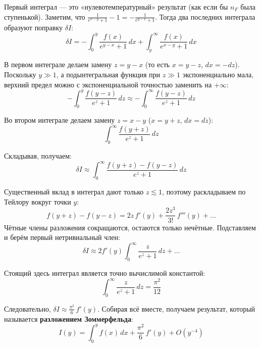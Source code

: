 \documentclass[../general/general]{subfiles}
\begin{document}
Первый интеграл --- это «нулевотемпературный» результат (как если бы $n_F$ была ступенькой). Заметим, что $\frac{1}{e^{x-y}+1} - 1 = -\frac{1}{e^{y-x}+1}$. Тогда два последних интеграла образуют поправку $\delta I$:
\begin{equation}
    \delta I = -\int_0^y \frac{f(x)}{e^{y-x}+1}\, dx + \int_y^\infty \frac{f(x)}{e^{x-y}+1}\, dx
\end{equation}

В первом интеграле делаем замену $z = y - x$ (то есть $x = y - z$, $dx = -dz$). Поскольку $y \gg 1$, а подынтегральная функция при $z \gg 1$ экспоненциально мала, верхний предел можно с экспоненциальной точностью заменить на $+\infty$:
\begin{equation}
    -\int_0^y \frac{f(y-z)}{e^z+1}\, dz \approx -\int_0^\infty \frac{f(y-z)}{e^z+1}\, dz
\end{equation}

Во втором интеграле делаем замену $z = x - y$ ($x = y + z$, $dx = dz$):
\begin{equation}
    \int_0^\infty \frac{f(y+z)}{e^z+1}\, dz
\end{equation}

Складывая, получаем:
\begin{equation}
    \delta I \approx \int_0^\infty \frac{f(y+z) - f(y-z)}{e^z+1}\, dz
\end{equation}

Существенный вклад в интеграл дают только $z \lesssim 1$, поэтому раскладываем по Тейлору вокруг точки $y$:
\begin{equation}
    f(y+z) - f(y-z) = 2z\,f'(y) + \frac{2z^3}{3!}\,f'''(y) + \ldots
\end{equation}
Чётные члены разложения сокращаются, остаются только нечётные. Подставляем и берём первый нетривиальный член:
\begin{equation}
    \delta I \approx 2f'(y) \int_0^\infty \frac{z}{e^z+1}\, dz + \ldots
\end{equation}

Стоящий здесь интеграл является точно вычислимой константой:
\begin{equation}
    \int_0^\infty \frac{z}{e^z+1}\, dz = \frac{\pi^2}{12}
\end{equation}

Следовательно, $\delta I \approx \frac{\pi^2}{6}\,f'(y)$. Собирая всё вместе, получаем результат, который называется \textbf{разложением Зоммерфельда}:
\begin{equation}
    \boxed{I(y) = \int_0^y f(x)\, dx + \frac{\pi^2}{6}\, f'(y) + O(y^{-4})}
\end{equation}
\end{document}
